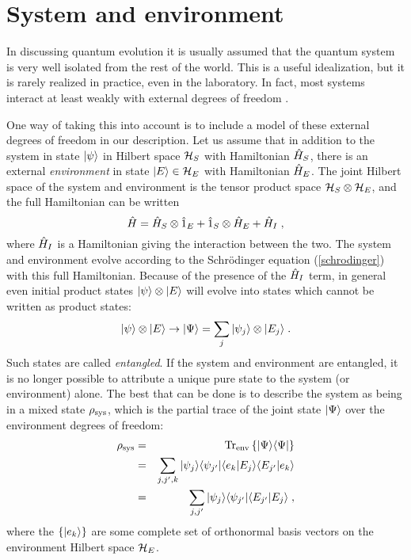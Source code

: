 \section{System and environment}

In discussing quantum evolution it is usually assumed that the quantum
system is very well isolated from the rest of the world.  This is a
useful idealization, but it is rarely realized in practice, even
in the laboratory.  In fact, most systems interact at least
weakly with external degrees of freedom \cite{Zurek,Joos}.

One way of taking this into account is to include
a model of these external degrees
of freedom in our description.  Let us assume that in addition
to the system in state ${| \psi \rangle}$ in Hilbert space ${\cal H}_S$
with Hamiltonian ${\hat H}_S$, there is an external {\it environment}
in state $\ket{E}\in{\cal H}_E$ with Hamiltonian ${\hat H}_E$.
The joint Hilbert space of the system and environment is the tensor product
space ${\cal H}_S\otimes{\cal H}_E$, and the full Hamiltonian
can be written
\begin{equation}
{\hat H} = {\hat H}_S\otimes{\hat 1}_E + {\hat 1}_S\otimes{\hat H}_E + {\hat H}_I \;,
\end{equation}
where ${\hat H}_I$ is a Hamiltonian giving the interaction between the two.
The system and environment evolve according to the Schr\"odinger
equation (\ref{schrodinger}) with this full Hamiltonian.  Because of
the presence of the ${\hat H}_I$ term, in general even initial product states
${| \psi \rangle}\otimes{| E \rangle}$ will evolve into states which cannot be
written as product states:
\begin{equation}
{| \psi \rangle}\otimes{| E \rangle} \rightarrow
  {| \Psi \rangle} = \sum_j {| \psi_j \rangle}\otimes{| E_j \rangle} \;.
\label{entangled}
\end{equation}
Such states are called {\it entangled}.  If the system and environment
are entangled, it is no longer possible to attribute a unique pure state
to the system (or environment) alone.  The best that can be done is to
describe the system as being in a mixed state $\rho_{\rm sys}$, which
is the partial trace of the joint state ${| \Psi \rangle}$ over the environment
degrees of freedom:
\begin{eqnarray}
\rho_{\rm sys} &=& {\rm Tr}_{\rm env} \left\{ {| \Psi \rangle}{\langle \Psi |} \right\} \nonumber\\
&=& \sum_{j,j',k} {| \psi_j \rangle}{\langle \psi_{j'} |}
  {\langle e_k | E_j \rangle}{\langle E_{j'} | e_k \rangle} \nonumber\\
&=& \sum_{j,j'} {| \psi_j \rangle}{\langle \psi_{j'} |}
  {\langle E_{j'} | E_j \rangle} \;,
\end{eqnarray}
where the $\{{| e_k \rangle}\}$ are some complete set of orthonormal basis vectors
on the environment Hilbert space ${\cal H}_E$.

